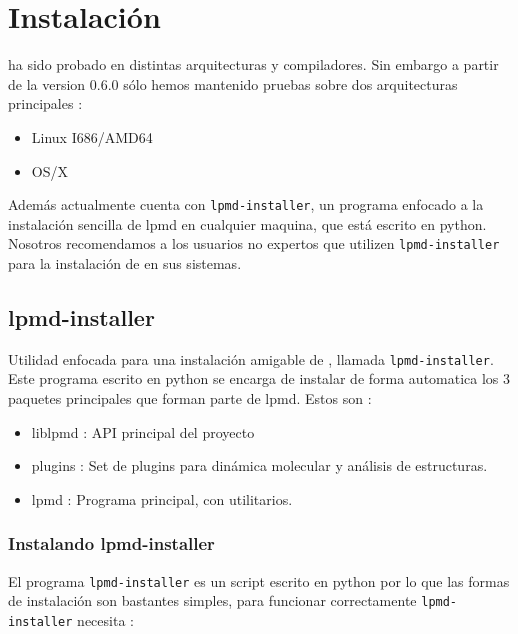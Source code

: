 \chapter{Instalaci\'on}
\label{chap:inst}

{\lpmd} ha sido probado en distintas arquitecturas y compiladores. Sin embargo a partir de la version 0.6.0 s\'olo hemos mantenido pruebas sobre dos arquitecturas principales :

\begin{itemize}
 \item Linux I686/AMD64
 \item OS/X
\end{itemize}

Adem\'as actualmente {\lpmd} cuenta con \verb|lpmd-installer|, un programa enfocado a la instalaci\'on sencilla de lpmd en cualquier maquina, que est\'a escrito en python. Nosotros recomendamos a los usuarios no expertos que utilizen \verb|lpmd-installer| para la instalaci\'on de {\lpmd} en sus sistemas.

\section{lpmd-installer}

Utilidad enfocada para una instalación amigable de {\lpmd}, llamada \verb|lpmd-installer|. Este programa escrito en python se encarga de instalar de forma automatica los 3 paquetes principales que forman parte de lpmd. Estos son :

\begin{itemize}
 \item liblpmd : API principal del proyecto
 \item plugins : Set de plugins para din\'amica molecular y an\'alisis de estructuras.
 \item lpmd : Programa principal, con utilitarios.
\end{itemize}


\subsection{Instalando lpmd-installer}

El programa \verb|lpmd-installer| es un script escrito en python por lo que las formas de instalaci\'on son bastantes simples, para funcionar correctamente \verb|lpmd-installer| necesita :

